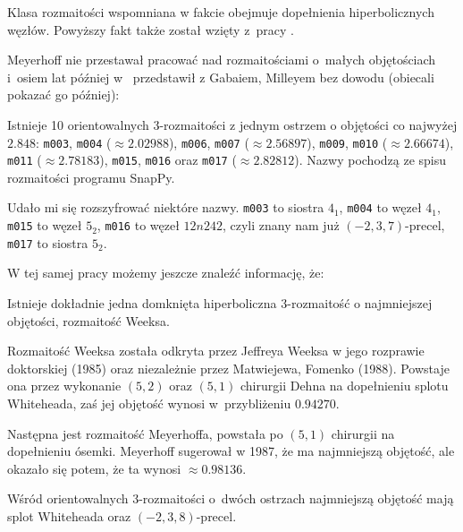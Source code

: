 Klasa rozmaitości wspomniana w fakcie obejmuje dopełnienia hiperbolicznych węzłów.
Powyższy fakt także został wzięty z~pracy \cite{cao01}.

Meyerhoff nie przestawał pracować nad rozmaitościami o~małych objętościach i~osiem lat później w~\cite{meyerhoff09} przedstawił z Gabaiem, Milleyem bez dowodu (obiecali pokazać go później):

\begin{proposition}
    Istnieje 10 orientowalnych 3-rozmaitości z jednym ostrzem o objętości co najwyżej $2.848$: \texttt{m003}, \texttt{m004} ($\approx 2.02988$), \texttt{m006}, \texttt{m007} ($\approx 2.56897$), \texttt{m009}, \texttt{m010} ($\approx 2.66674$), \texttt{m011} ($\approx 2.78183$), \texttt{m015}, \texttt{m016} oraz \texttt{m017} ($\approx 2.82812$).
    Nazwy pochodzą ze spisu rozmaitości programu SnapPy. 
\end{proposition}

Udało mi się rozszyfrować niektóre nazwy.
\texttt{m003} to siostra $4_1$, %
\texttt{m004} to węzeł $4_1$, %
\texttt{m015} to węzeł $5_2$,
\texttt{m016} to węzeł $12n242$, czyli znany nam już $(-2, 3, 7)$-precel,
%
\texttt{m017} to siostra $5_2$. %

W tej samej pracy możemy jeszcze znaleźć informację, że:

\begin{proposition}
    Istnieje dokładnie jedna domknięta hiperboliczna 3-rozmaitość o najmniejszej objętości, rozmaitość Weeksa.
\end{proposition}

Rozmaitość Weeksa została odkryta przez Jeffreya Weeksa w jego rozprawie doktorskiej (1985) oraz niezależnie przez Matwiejewa, Fomenko (1988).
Powstaje ona przez wykonanie $(5, 2)$ oraz $(5, 1)$ chirurgii Dehna na dopełnieniu splotu Whiteheada, zaś jej objętość wynosi w~przybliżeniu $0.94270$. %

Następna jest rozmaitość Meyerhoffa, powstała po $(5, 1)$ chirurgii na dopełnieniu ósemki.
Meyerhoff sugerował w 1987, że ma najmniejszą objętość, ale okazało się potem, że ta wynosi $\approx 0.98136$.

\begin{proposition}
    Wśród orientowalnych 3-rozmaitości o~dwóch ostrzach najmniejszą objętość mają splot Whiteheada oraz $(-2, 3, 8)$-precel.
%
%
\end{proposition}

